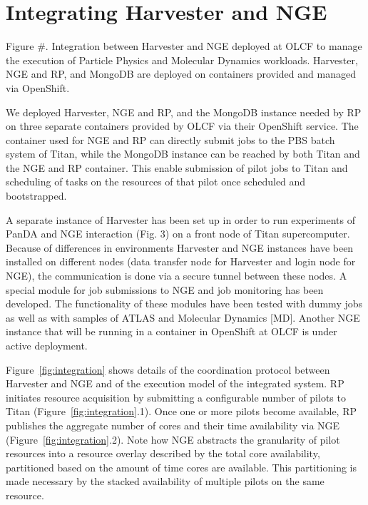 \documentclass{webofc}
\begin{document}
\section{Integrating Harvester and NGE}

Figure #. Integration between Harvester and NGE deployed at OLCF to manage the execution of Particle Physics and Molecular Dynamics workloads. Harvester, NGE and RP, and MongoDB are deployed on containers provided and managed via OpenShift.

We deployed Harvester, NGE and RP, and the MongoDB instance needed by RP on three separate containers provided by OLCF via their OpenShift service. The container used for NGE and RP can directly submit jobs to the PBS batch system of Titan, while the MongoDB instance can be reached by both Titan and the NGE and RP container. This enable submission of pilot jobs to Titan and scheduling of tasks on the resources of that pilot once scheduled and bootstrapped.

A separate instance of Harvester has been set up in order to run experiments of PanDA and NGE interaction (Fig. 3) on a front node of Titan supercomputer. Because of differences in environments Harvester and NGE instances have been installed on different nodes (data transfer node for Harvester and login node for NGE), the communication is done via a secure tunnel between these nodes. A special module for job submissions to NGE and job monitoring has been developed. The functionality of these modules have been tested with dummy jobs as well as with samples of ATLAS and Molecular Dynamics [MD]. Another NGE instance that will be running in a container in OpenShift at OLCF is under active deployment.

Figure~\ref{fig:integration} shows details of the coordination protocol between Harvester and NGE and of the execution model of the integrated system. RP initiates resource acquisition by submitting a configurable number of pilots to Titan (Figure~\ref{fig:integration}.1). Once one or more pilots become available, RP publishes the aggregate number of cores and their time availability via NGE (Figure~\ref{fig:integration}.2). Note how NGE abstracts the granularity of pilot resources into a resource overlay described by the total core availability, partitioned based on the amount of time cores are available. This partitioning is made necessary by the stacked availability of multiple pilots on the same resource. 
\end{document}
